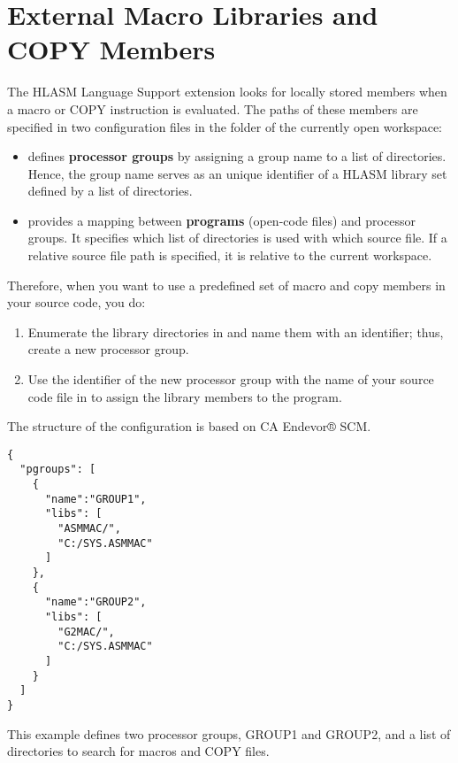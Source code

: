 \section{External Macro Libraries and COPY Members}
\label{sec:configuration}

The HLASM Language Support extension looks for locally stored members when a macro or COPY instruction is evaluated. The paths of these members are specified in two configuration files in the  folder of the currently open workspace:
\begin{itemize}
	\item  {} defines \textbf{processor groups} by assigning a group name to a list of directories. Hence, the group name serves as an unique identifier of a HLASM library set defined by a list of directories.
	
	
	\item  {} provides a mapping between \textbf{programs} (open-code files) and processor groups. It specifies which list of directories is used with which source file. If a relative source file path is specified, it is relative to the current workspace.
\end{itemize}

Therefore, when you want to use a predefined set of macro and copy members in your source code, you do: 
\begin{enumerate}
	\item Enumerate the library directories in  and name them with an identifier; thus, create a new processor group.
	\item Use the identifier of the new processor group with the name of your source code file in  to assign the library members to the program.
\end{enumerate}

The structure of the configuration is based on CA Endevor® SCM.


\begin{listing}
	\begin{verbatim}
{
  "pgroups": [
    {
      "name":"GROUP1",
      "libs": [
        "ASMMAC/",
        "C:/SYS.ASMMAC"
      ]
    },
    {
      "name":"GROUP2",
      "libs": [
        "G2MAC/",
        "C:/SYS.ASMMAC"
      ]
    }
  ]
}
	\end{verbatim}
	\caption{This example defines two processor groups, GROUP1 and GROUP2, and a list of directories to search for macros and COPY files.}
	\label{lst:ex1}
\end{listing}

